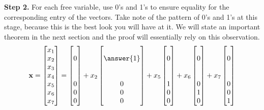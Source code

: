 \documentclass{ximera}
\begin{document}
\begin{example}
  \textbf{Step 2.}  For each free variable, use 0's and 1's to ensure
  equality for the corresponding entry of the vectors.  Take note of
  the pattern of 0's and 1's at this stage, because this is the best
  look you will have at it.  We will state an important theorem in the
  next section and the proof will essentially rely on this
  observation.
  \[
    \vect{x}=\colvector{x_1\\x_2\\x_3\\x_4\\x_5\\x_6\\x_7}=
    \colvector{\ \\0\\\ \\\ \\0\\0\\0}+
    x_2\colvector{\ \\\answer{1}\\\ \\\ \\0\\0\\0}+
    x_5\colvector{\ \\0\\\ \\\ \\1\\0\\0}+
    x_6\colvector{\ \\0\\\ \\\ \\0\\1\\0}+
    x_7\colvector{\ \\0\\\ \\\ \\0\\0\\1}
  \]


\end{example}
\end{document}
